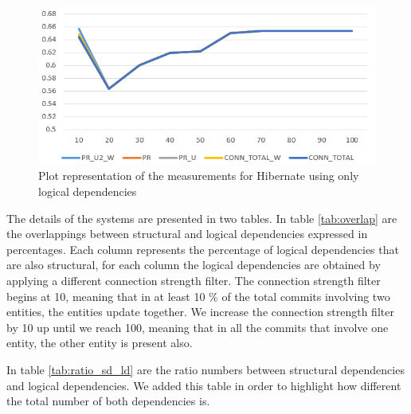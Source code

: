 \documentclass[12pt]{mitthesis}
\begin{document}
\begin{figure}[H]
\centering
\includegraphics[width=\textwidth]{hibernate_LD.PNG}
\caption{ Plot representation of the measurements for Hibernate using only logical dependencies }
\label{fig:plot_ld_hibernate}
\centering
\end{figure}


The details of the systems are presented in two tables.  In table \ref{tab:overlap} are the overlappings between structural and logical dependencies expressed in percentages. Each column represents the percentage of logical dependencies that are also structural, for each column the logical dependencies are obtained by applying a different connection strength filter. The connection strength filter begins at 10, meaning that in at least 10 \% of the total commits involving two entities, the entities update together. We increase the connection strength filter by 10 up until we reach 100, meaning that in all the commits that involve one entity, the other entity is present also.


In table \ref{tab:ratio_sd_ld} are the ratio numbers between structural dependencies and logical dependencies. We added this table in order to highlight how different the total number of both dependencies is.


\begin{table}[!h]
\renewcommand{\arraystretch}{1}
\caption{Percentage of logical dependencies that are also structural dependencies}
\label{tab:overlap}
\centering
{}
\end{table}
\end{document}
